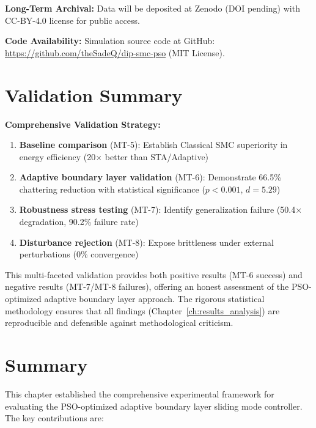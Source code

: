 \textbf{Long-Term Archival:} Data will be deposited at Zenodo (DOI pending) with CC-BY-4.0 license for public access.

\textbf{Code Availability:} Simulation source code at GitHub: \url{https://github.com/theSadeQ/dip-smc-pso} (MIT License).

\section{Validation Summary}
\label{sec:validation_summary}

\textbf{Comprehensive Validation Strategy:}
\begin{enumerate}
    \item \textbf{Baseline comparison} (MT-5): Establish Classical SMC superiority in energy efficiency (20$\times$ better than STA/Adaptive)
    \item \textbf{Adaptive boundary layer validation} (MT-6): Demonstrate 66.5\% chattering reduction with statistical significance ($p < 0.001$, $d = 5.29$)
    \item \textbf{Robustness stress testing} (MT-7): Identify generalization failure (50.4$\times$ degradation, 90.2\% failure rate)
    \item \textbf{Disturbance rejection} (MT-8): Expose brittleness under external perturbations (0\% convergence)
\end{enumerate}

This multi-faceted validation provides both positive results (MT-6 success) and negative results (MT-7/MT-8 failures), offering an honest assessment of the PSO-optimized adaptive boundary layer approach. The rigorous statistical methodology ensures that all findings (Chapter~\ref{ch:results_analysis}) are reproducible and defensible against methodological criticism.

\section{Summary}
\label{sec:chapter6_summary}

This chapter established the comprehensive experimental framework for evaluating the PSO-optimized adaptive boundary layer sliding mode controller. The key contributions are:

